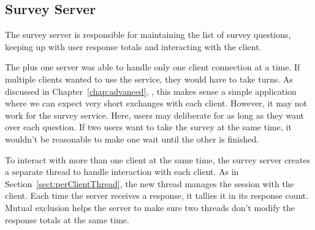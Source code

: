 \subsection{Survey Server}

The survey server is responsible for maintaining the list of survey
questions, keeping up with user response totals and interacting with
the client.

The plus one server was able to handle only one client connection at a
time.  If multiple clients wanted to use the service, they would have
to take turns.  As discussed in Chapter~\ref{chap:advanced},
, this makes sense a simple application where
we can expect very short exchanges with each client.  However, it may not
work for the survey service.  Here, users may deliberate for
as long as they want over each question.  If two users want to take
the survey at the same time, it wouldn't be reasonable to make one
wait until the other is finished.

To interact with more than one client at the same time, the survey
server creates a separate thread to handle interaction with each
client.  As in Section~\ref{sect:perClientThread}, the new thread
manages the session with the client.  Each time the server receives a
response, it tallies it in its response count.  Mutual exclusion helps
the server to make sure two threads don't modify the response totals
at the same time.


